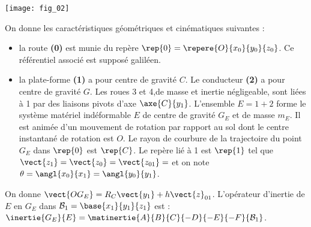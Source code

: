 \begin{marginfigure}
\texttt{[image: fig\_02]}
\end{marginfigure}


On donne les caractéristiques géométriques et cinématiques suivantes :
\begin{itemize}
\item la route \textbf{(0)} est munie du repère $\rep{0}=\repere{O}{x_0}{y_0}{z_0}$. Ce référentiel associé est supposé galiléen.
\item la plate-forme \textbf{(1)} a pour centre de gravité $C$. Le conducteur \textbf{(2)} a pour centre de gravité $G$. Les roues 3 et 4,de masse et inertie négligeable, sont liées à 1 par des liaisons pivots d'axe $\axe{C}{y_1}$. L’ensemble 
$E=1 + 2$ forme le système matériel indéformable $E$ de centre de gravité $G_E$ et de masse $m_E$. Il est animée d'un mouvement de rotation par rapport au sol dont le centre instantané de rotation est $O$. Le rayon de courbure de la trajectoire du point $G_E$ dans $\rep{0}$ est $\rep{C}$. Le repère lié à 1 est $\rep{1}$  tel que $\vect{z_1}=\vect{z_0}=\vect{z_{01}}=$ et on note $\theta=\angl{x_0}{x_1}=\angl{y_0}{y_1}$. 
\end{itemize}


On donne $\vect{OG_E}=R_C\vect{y_1}+h\vect{z}_{01}$. L'opérateur d'inertie de $E$ en $G_E$ dans $\mathcal{B}_1=\base{x_1}{y_1}{z_1}$ est : 
$\inertie{G_E}{E}=\matinertie{A}{B}{C}{-D}{-E}{-F}{\mathcal{B}_1}$.

